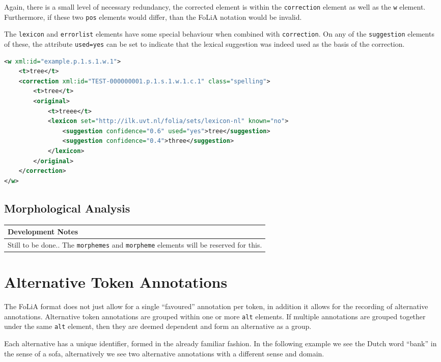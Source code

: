 \documentclass[a4paper,12pt]{report}
\newenvironment{devnotes}
{\newpage
\begin{center}
    \begin{tabular}[h!]{|p{0.8\textwidth}|}
    \hline
    {\bf Development Notes}\\\hline}
{   \\\hline
    \end{tabular}
\end{center}}
\begin{document}
Again, there is a small level of necessary redundancy, the corrected element is within the \texttt{correction} element as well as the \texttt{w} element. Furthermore, if these two \texttt{pos} elements would differ, than the FoLiA notation would be invalid.

The \texttt{lexicon} and \texttt{errorlist} elements have some special behaviour when combined with \texttt{correction}. On any of the \texttt{suggestion} elements of these, the attribute \texttt{used=yes} can be set to indicate that the lexical suggestion was indeed used as the basis of the correction.


\begin{lstlisting}[language=xml]
<w xml:id="example.p.1.s.1.w.1">
    <t>tree</t>
    <correction xml:id="TEST-000000001.p.1.s.1.w.1.c.1" class="spelling">
        <t>tree</t>
        <original>
            <t>treee</t>
            <lexicon set="http://ilk.uvt.nl/folia/sets/lexicon-nl" known="no">
                <suggestion confidence="0.6" used="yes">tree</suggestion>
                <suggestion confidence="0.4">three</suggestion>
            </lexicon>    
        </original>        
    </correction>
</w>
\end{lstlisting}


\subsection{Morphological Analysis}

\begin{devnotes}
Still to be done.. The \texttt{morphemes} and \texttt{morpheme} elements will be reserved for this.
\end{devnotes}


\section{Alternative Token Annotations}

The FoLiA format does not just allow for a single ``favoured'' annotation per token, in addition it allows for the recording of alternative annotations. Alternative token annotations are grouped within one or more \texttt{alt} elements. If multiple annotations are grouped together under the same \texttt{alt} element, then they are deemed dependent and form an alternative as a group.

Each alternative has a unique identifier, formed in the already familiar fashion. In the following example we see the Dutch word ``bank'' in the sense of a sofa, alternatively we see two alternative annotations with a different sense and domain.
\end{document}
